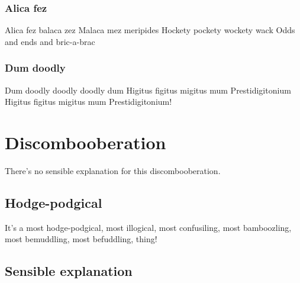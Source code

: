\section{Alica fez}
Alica fez balaca zez
Malaca mez meripides
Hockety pockety wockety wack
Odds and ends and bric-a-brac

\section{Dum doodly}

Dum doodly doodly doodly dum
Higitus figitus migitus mum
Prestidigitonium
Higitus figitus migitus mum
Prestidigitonium!

\part{Discombooberation}

There's no sensible explanation for this discombooberation.

\chapter{Hodge-podgical}

It's a most hodge-podgical,
most illogical,
most confusiling,
most bamboozling,
most bemuddling,
most befuddling,
thing!

\chapter{Sensible explanation}

\todo
